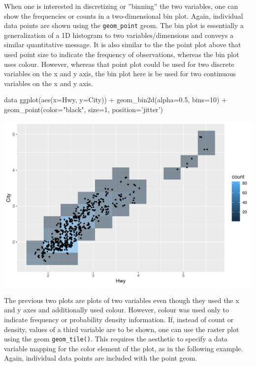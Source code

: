 When one is interested in discretizing or ''binning'' the two variables, one can show the frequencies or counts in a two-dimensional bin plot. Again, individual data points are shown using the \texttt{geom\_point} geom. The bin plot is essentially a generalization of a 1D histogram to two variables/dimensions and conveys a similar quantitative message. It is also similar to the the point plot above that used point size to indicate the frequency of observations, whereas the bin plot uses colour. However, whereas that point plot could be used for two discrete variables on the x and y axis, the bin plot here is be used for two continuous variables on the x and y axis.

\begin{samepage}
\begin{Rcode}
data %
  ggplot(aes(x=Hwy, y=City)) + 
    geom_bin2d(alpha=0.5, bins=10) +
    geom_point(color="black", size=1, position='jitter')
\end{Rcode}
\end{samepage}

\begin{center}
  \includegraphics[width=.8\textwidth]{fuel.bin2d.pdf}
\end{center}



The previous two plots are plots of two variables even though they used the x and y axes and additionally used colour. However, colour was used only to indicate frequency or probability density information. If, instead of count or density, values of a third variable are to be shown, one can use the raster plot using the geom \texttt{geom\_tile()}. This requires the aesthetic to specify a data variable mapping for the color element of the plot, as in the following example. Again, individual data points are included with the point geom.

